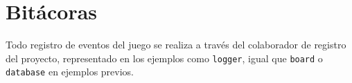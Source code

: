 \section{Bitácoras}

Todo registro de eventos del juego se realiza a través del colaborador de registro del proyecto, representado en los ejemplos como \texttt{logger}, igual que \texttt{board} o \texttt{database} en ejemplos previos.



